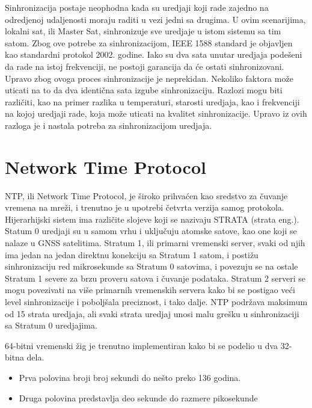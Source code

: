\documentclass[a4paper,12pt, master]{etf}
\begin{document}
	Sinhronizacija postaje neophodna kada su uredjaji koji rade zajedno na odredjenoj
	udaljenosti moraju raditi u vezi jedni sa drugima. U ovim scenarijima, lokalni sat, ili
	Master Sat, sinhronizuje sve uredjaje u istom sistemu sa tim satom. Zbog ove potrebe za
	sinhronizacijom, IEEE 1588 standard je objavljen kao standardni protokol 2002. godine.
	Iako su dva sata unutar uredjaja pode\v{s}eni da rade na istoj frekvenciji, ne postoji garancija
	da \'{c}e ostati sinhronizovani. Upravo zbog ovoga proces sinhronizacije je neprekidan. Nekoliko
	faktora mo\v{z}e uticati na to da dva identi\v{c}na sata izgube sinhronizaciju. Razlozi mogu biti
	razli\v{c}iti, kao na primer razlika u temperaturi, starosti uredjaja, kao i frekvenciji na kojoj
	uredjaji rade, koja mo\v{z}e uticati na kvalitet sinhronizacije. Upravo iz ovih razloga je i
	nastala potreba za sinhronizacijom uredjaja.

	\section{Network Time Protocol}

	NTP, ili Network Time Protocol, je \v{s}iroko prihva\'{c}en kao sredstvo za \v{c}uvanje vremena na
	mre\v{z}i, i trenutno je u upotrebi \v{c}etvrta verzija samog protokola. Hijerarhijski sistem ima
	razli\v{c}ite slojeve koji se nazivaju STRATA (strata eng.). Statum 0
	uredjaji su u samom vrhu i uklju\v{c}uju atomske satove, kao one koji se nalaze u GNSS
	satelitima.	Stratum 1, ili primarni vremenski server, svaki od njih ima jedan na jedan
	direktnu konekciju sa Stratum 1 satom, i posti\v{z}u sinhronizaciju red mikrosekunde sa Stratum
	0 satovima, i povezuju se na ostale Stratum 1 severe za brzu proveru satova i \v{c}uvanje
	podataka. Stratum 2 serveri se mogu povezivati na vi\v{s}e primarnih vremenskih servera kako
	bi se postigao ve\'{c}i level sinhronizacije i pobolj\v{s}ala preciznost, i tako dalje. NTP
	podr\v{z}ava maksimum od 15 strata uredjaja, ali svaki strata uredjaj unosi malu gre\v{s}ku u
	sinhronizaciji sa Stratum 0 uredjajima.

	64-bitni vremenski \v{z}ig je trenutno implementiran kako bi se podelio u dva 32-bitna dela.
	\begin{itemize}
		\item Prva polovina broji broj sekundi do ne\v{s}to preko 136 godina.
		\item Druga polovina predstavlja deo sekunde do razmere pikosekunde
	\end{itemize}
\end{document}
